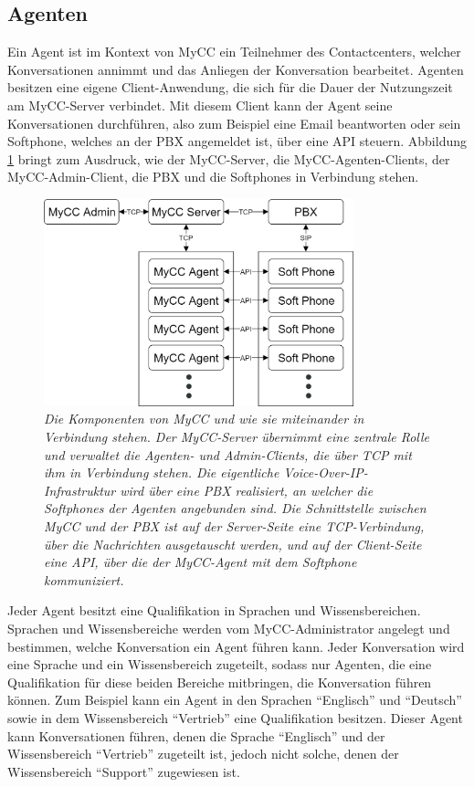 \subsection{Agenten}
\label{subsec:Agenten}
Ein Agent ist im Kontext von MyCC ein Teilnehmer des Contactcenters, welcher Konversationen annimmt und das Anliegen der Konversation bearbeitet. Agenten besitzen eine eigene Client-Anwendung, die sich für die Dauer der Nutzungszeit am MyCC-Server verbindet.  Mit diesem Client kann der Agent seine Konversationen durchführen, also zum Beispiel eine Email beantworten oder sein Softphone, welches an der PBX angemeldet ist, über eine API steuern. Abbildung \ref{fig:MyCCStructure}  bringt zum Ausdruck, wie der MyCC-Server, die MyCC-Agenten-Clients, der MyCC-Admin-Client, die PBX und die Softphones in Verbindung stehen.
\begin{figure} %
	\centering
		\includegraphics[width=0.8\textwidth]{img/MyCCStructure.png}
	\caption[Komponentenstruktur von MyCC]{\textit{Die Komponenten von MyCC und wie sie miteinander in Verbindung stehen. Der MyCC-Server übernimmt eine zentrale Rolle und verwaltet die Agenten- und Admin-Clients, die über TCP mit ihm in Verbindung stehen. Die eigentliche Voice-Over-IP-Infrastruktur wird über eine PBX realisiert, an welcher die Softphones der Agenten angebunden sind. Die Schnittstelle zwischen MyCC und der PBX ist auf der Server-Seite eine TCP-Verbindung, über die Nachrichten ausgetauscht werden, und auf der Client-Seite eine API, über die der MyCC-Agent mit dem Softphone kommuniziert.}}
	\label{fig:MyCCStructure}
\end{figure}
Jeder Agent besitzt eine Qualifikation in Sprachen und Wissensbereichen. Sprachen und Wissensbereiche werden vom MyCC-Administrator angelegt und bestimmen, welche Konversation ein Agent führen kann. Jeder Konversation wird eine Sprache und ein Wissensbereich zugeteilt, sodass nur Agenten, die eine Qualifikation für diese beiden Bereiche mitbringen, die Konversation führen können. Zum Beispiel kann ein Agent in den Sprachen ``Englisch'' und ``Deutsch'' sowie in dem Wissensbereich ``Vertrieb'' eine Qualifikation besitzen. Dieser Agent kann Konversationen führen, denen die Sprache ``Englisch'' und der Wissensbereich ``Vertrieb'' zugeteilt ist, jedoch nicht solche, denen der Wissensbereich ``Support'' zugewiesen ist.

